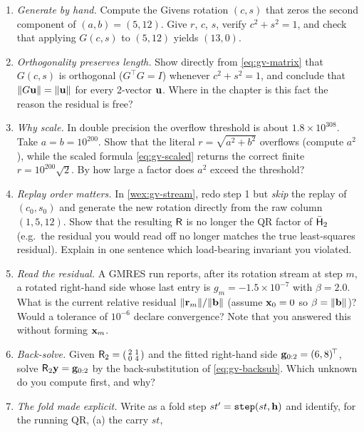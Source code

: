 \exercisessection
\begin{enumerate}[nosep]
  \item \emph{Generate by hand.} Compute the Givens rotation $(c,s)$ that zeros the
  second component of $(a,b) = (5,12)$. Give $r$, $c$, $s$, verify $c^2+s^2=1$, and check
  that applying $G(c,s)$ to $(5,12)$ yields $(13,0)$.
  \item \emph{Orthogonality preserves length.} Show directly from \cref{eq:gv-matrix}
  that $G(c,s)$ is orthogonal ($G^{\!\top}G = I$) whenever $c^2+s^2=1$, and conclude that
  $\lVert G\mathbf{u}\rVert = \lVert\mathbf{u}\rVert$ for every 2-vector $\mathbf{u}$. Where in the chapter is this fact
  the reason the residual is free?
  \item \emph{Why scale.} In double precision the overflow threshold is about
  $1.8\times10^{308}$. Take $a = b = 10^{200}$. Show that the literal $r=\sqrt{a^2+b^2}$
  overflows (compute $a^2$), while the scaled formula \eqref{eq:gv-scaled} returns the
  correct finite $r = 10^{200}\sqrt2$. By how large a factor does $a^2$ exceed the
  threshold?
  \item \emph{Replay order matters.} In \cref{wex:gv-stream}, redo step 1 but
  \emph{skip} the replay of $(c_0,s_0)$ and generate the new rotation directly from the
  raw column $(1,5,12)$. Show that the resulting $\mathsf{R}$ is no longer the QR factor of
  $\bar{\mathsf{H}}_2$ (e.g.\ the residual you would read off no longer matches the true
  least-squares residual). Explain in one sentence which load-bearing invariant you
  violated.
  \item \emph{Read the residual.} A GMRES run reports, after its rotation stream at step
  $m$, a rotated right-hand side whose last entry is $g_{m} = -1.5\times10^{-7}$ with
  $\beta = 2.0$. What is the current relative residual $\lVert\mathbf{r}_m\rVert/\lVert\mathbf{b}\rVert$
  (assume $\mathbf{x}_0=0$ so $\beta=\lVert\mathbf{b}\rVert$)? Would a tolerance of $10^{-6}$ declare
  convergence? Note that you answered this without forming $\mathbf{x}_m$.
  \item \emph{Back-solve.} Given $\mathsf{R}_2 = \begin{psmallmatrix} 2 & 1 \\ 0 & 4
  \end{psmallmatrix}$ and the fitted right-hand side $\mathbf{g}_{0:2} = (6, 8)^{\!\top}$, solve
  $\mathsf{R}_2\mathbf{y} = \mathbf{g}_{0:2}$ by the back-substitution of \cref{eq:gv-backsub}. Which
  unknown do you compute first, and why?
  \item \emph{The fold made explicit.} Write  as a fold step
  $st' = \texttt{step}(st, \mathbf{h})$ and identify, for the running QR, (a) the carry $st$,

\end{enumerate}
